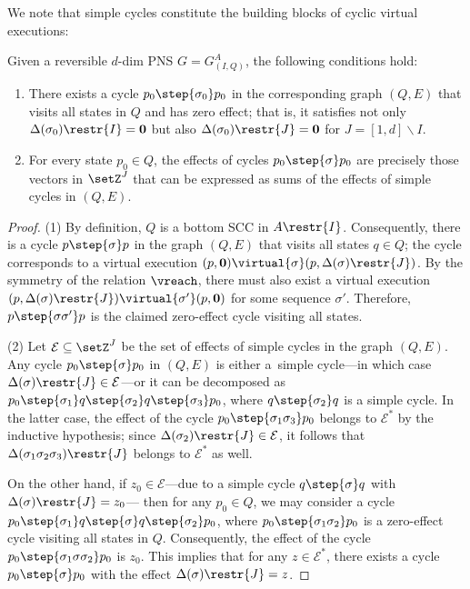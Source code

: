 \noindent
We note that simple cycles constitute the building blocks of
cyclic virtual executions:

\begin{prop}\label{prop:cycles}
	Given a reversible $d$-dim PNS $G=G_{(I,Q)}^A$, the following
	conditions hold:
	\begin{enumerate}
		\item	There exists a cycle
	$p_0\step{\sigma_0}p_0$ in the corresponding graph $(Q,E)$
	that visits all states in $Q$ and has zero effect; that
			is, it satisfies 
			not only
	$\Delta(\sigma_0)\restr{I}=\mathbf{0}$ but also
	$\Delta(\sigma_0)\restr{J}=\mathbf{0}$ for
			$J=[1,d]\smallsetminus I$.
\item 
	For every state $p_0\in Q$, the effects of cycles
			$p_0\step{\sigma}p_0$
			are precisely those vectors in $\setZ^J$ that
			can be expressed as sums of the effects of
			simple cycles in $(Q,E)$.
	\end{enumerate}
	\end{prop}
\begin{proof}
	(1) By definition, $Q$ is a bottom SCC in $A\restr{I}$.
	Consequently, there is a cycle $p\step{\sigma}p$ in the graph
	$(Q,E)$ that visits all states $q\in Q$; the cycle corresponds to a virtual
	execution
	$(p,\mathbf{0})\virtual{\sigma}(p,\Delta(\sigma)\restr{J})$.
	By the symmetry of the relation $\vreach$, there must also
	exist a virtual execution
	$(p,\Delta(\sigma)\restr{J})\virtual{\sigma'}(p,\mathbf{0})$
	for some sequence $\sigma'$. Therefore,
	$p\step{\sigma\sigma'}p$ is the
	claimed zero-effect cycle visiting all states.

	(2) Let $\mathcal{E}\subseteq \setZ^J$ be the set
	of effects of simple cycles in the graph $(Q,E)$.
Any cycle $p_0\step{\sigma}p_0$ in 
	$(Q,E)$ is either a~simple cycle---in which case
	$\Delta(\sigma)\restr{J}\in\mathcal{E}$---or it can be
	decomposed as 
	$p_0\step{\sigma_1}q\step{\sigma_2}q\step{\sigma_3}p_0$, where
	$q\step{\sigma_2}q$ is a simple cycle. In the latter case, the
	effect of the cycle $p_0\step{\sigma_1\sigma_3}p_0$ belongs to
	$\mathcal{E}^*$ by the inductive hypothesis; since
	$\Delta(\sigma_2)\restr{J}\in\mathcal{E}$, it follows
	that $\Delta(\sigma_1\sigma_2\sigma_3)\restr{J}$ belongs to
	$\mathcal{E}^*$ as well. 

	On the other hand, if $z_0\in \mathcal{E}$---due to 
	 a simple
	cycle $q\step{\sigma}q$ with $\Delta(\sigma)\restr{J}=z_0$---
	then for any $p_0\in Q$, we may consider a cycle
	$p_0\step{\sigma_1}q\step{\sigma}q\step{\sigma_2}p_0$, where 
	$p_0\step{\sigma_1\sigma_2}p_0$ is a zero-effect cycle visiting
	all states in $Q$. Consequently, the effect of the cycle
	$p_0\step{\sigma_1\sigma\sigma_2}p_0$ is $z_0$.
	This implies that for any
	$z\in\mathcal{E}^*$, there exists a cycle 
	$p_0\step{\sigma}p_0$ with the effect $\Delta(\sigma)\restr{J}=z$.
\end{proof}


